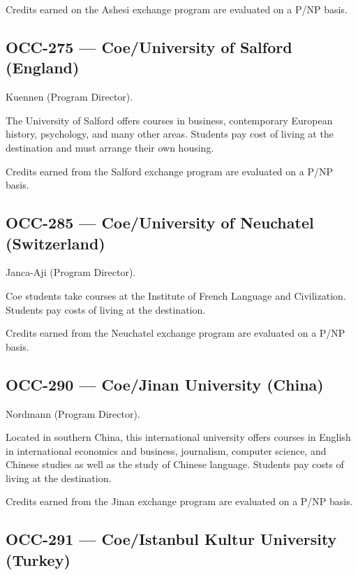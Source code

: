\documentclass[
  letterpaper,
]{scrbook}
\begin{document}
Credits earned on the Ashesi exchange program are evaluated on a P/NP
basis.

\subsection{OCC-275 --- Coe/University of Salford
(England)}\label{occ-275-coeuniversity-of-salford-england}

Kuennen (Program Director).

The University of Salford offers courses in business, contemporary
European history, psychology, and many other areas. Students pay cost of
living at the destination and must arrange their own housing.

Credits earned from the Salford exchange program are evaluated on a P/NP
basis.

\subsection{OCC-285 --- Coe/University of Neuchatel
(Switzerland)}\label{occ-285-coeuniversity-of-neuchatel-switzerland}

Janca-Aji (Program Director).

Coe students take courses at the Institute of French Language and
Civilization. Students pay costs of living at the destination.

Credits earned from the Neuchatel exchange program are evaluated on a
P/NP basis.

\subsection{OCC-290 --- Coe/Jinan University
(China)}\label{occ-290-coejinan-university-china}

Nordmann (Program Director).

Located in southern China, this international university offers courses
in English in international economics and business, journalism, computer
science, and Chinese studies as well as the study of Chinese language.
Students pay costs of living at the destination.

Credits earned from the Jinan exchange program are evaluated on a P/NP
basis.

\subsection{OCC-291 --- Coe/Istanbul Kultur University
(Turkey)}\label{occ-291-coeistanbul-kultur-university-turkey}
\end{document}
